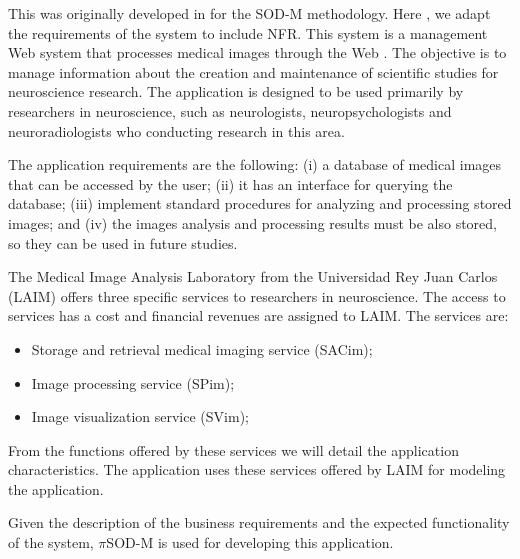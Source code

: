 This  was originally developed in \cite{valeriaThesis} for the SOD-M
methodology. Here , we adapt the requirements of the system to include NFR. This
system is a management Web system that processes medical images through the Web \cite{valeriaThesis}. The objective is to
manage information about the creation and maintenance of scientific studies
for neuroscience research. The application is designed to be used primarily by
researchers in neuroscience, such as neurologists, neuropsychologists and
neuroradiologists who conducting research in this area.

The application requirements are the following: (i) a
database of medical images that can be accessed by the user; (ii) it has an
interface for querying the database; (iii)  implement standard  procedures for analyzing
and processing stored images; and (iv) the images analysis and processing
results must be also stored, so they can be used in future studies. 

The  Medical Image Analysis Laboratory from the Universidad Rey Juan Carlos
(LAIM) offers three specific services to researchers in neuroscience. The access
to services has a cost and financial revenues are assigned to LAIM. The services
are:

\begin{itemize}
  \item Storage and retrieval medical imaging service (SACim);
  \item Image processing service (SPim);
  \item Image visualization service (SVim);
\end{itemize}

From the functions offered by these services we will detail the application
characteristics. The application uses these services offered by LAIM for
modeling the application. 



  
\bigskip
\bigskip
 
Given the description of the business requirements and the expected
functionality of the system, $\pi$SOD-M is used for developing this application. 

